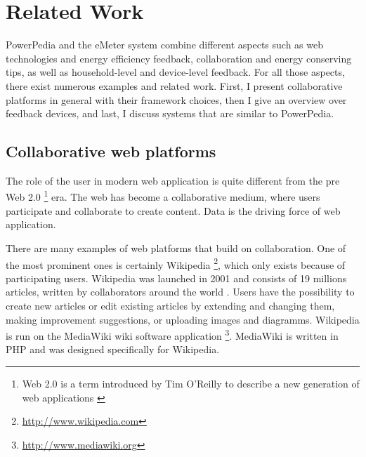 \section{Related Work}
 

PowerPedia and the eMeter system combine different aspects such as web technologies and energy efficiency feedback, collaboration and energy conserving tips, as well as household-level and device-level feedback. For all those aspects, there exist numerous examples and related work.
First, I present collaborative platforms in general with their framework choices, then I give an overview over feedback devices, and last, I discuss systems that are similar to PowerPedia. 

\subsection{Collaborative web platforms}\label{sec:collaborative_web_platforms}
The role of the user in modern web application is quite different from the pre Web 2.0 \footnote{Web 2.0 is a term introduced by Tim O'Reilly to describe a new generation of web applications \cite{web2_0}} era. The web has become a collaborative medium, where users participate and collaborate to create content. Data is the driving force of web application.

There are many examples of web platforms that build on collaboration. One of the most prominent ones is certainly Wikipedia \footnote{\url{http://www.wikipedia.com}}, which only exists because of participating users. Wikipedia was launched in 2001 and consists of 19 millions articles, written by collaborators around the world \cite{wikipedia}. Users have the possibility to create new articles or edit existing articles by extending and changing them, making improvement suggestions, or uploading images and diagramms. Wikipedia is run on the MediaWiki wiki software application \footnote{\url{http://www.mediawiki.org}}. MediaWiki is written in PHP and was designed specifically for Wikipedia. 

